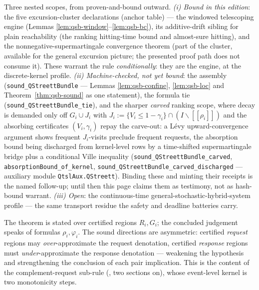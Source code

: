 \begin{bremark}\label{rem:qsb-scope}
Three nested scopes, from proven-and-bound outward. \emph{(i) Bound in
this edition}: the five excursion-cluster declarations (anchor table) ---
the windowed telescoping engine (Lemmas
\ref{lem:qsb-window}--\ref{lem:qsb-bc}), its additive-drift sibling for
plain reachability (the ranking hitting-time bound and almost-sure
hitting), and the nonnegative-supermartingale convergence theorem (part
of the cluster, available for the general excursion picture; the
presented proof path does not consume it). These warrant the rule
\emph{conditionally}: they are the engine, at the discrete-kernel
profile. \emph{(ii) Machine-checked, not yet bound}: the assembly
(\texttt{sound\_QStreettBundle} --- Lemmas \ref{lem:qsb-confine},
\ref{lem:qsb-loc} and Theorem~\ref{thm:qsb-sound} as one statement), the
formula tie (\texttt{sound\_QStreettBundle\_tie}), and the sharper
\emph{carved} ranking scope, where decay is demanded only off
$G_i \cup J_i$ with $J_i := \{V_i \le 1 - \gamma_i\} \cap
(I \smallsetminus [\![\rho_i]\!])$ and the absorbing certificates
$(V_i, \gamma_i)$ repay the carve-out: a L\'evy upward-convergence
argument shows frequent $J_i$-visits preclude frequent requests, the
absorption bound being discharged from kernel-level rows by a time-shifted
supermartingale bridge plus a conditional Ville inequality
(\texttt{sound\_QStreettBundle\_carved},
\texttt{absorptionBound\_of\_kernel},
\texttt{sound\_QStreettBundle\_carved\_discharged} --- auxiliary module
\texttt{QtslAux.QStreett}). Binding these and minting their
receipts is the named follow-up; until then this page claims them as
testimony, not as hash-bound warrant. \emph{(iii) Open}: the
continuous-time general-stochastic-hybrid-system profile --- the same
transport residue the safety and deadline batteries carry.
\end{bremark}

\begin{bremark}\label{rem:qsb-tie}
The theorem is stated over certified regions $R_i, G_i$; the concluded
judgement speaks of formulas $\rho_i, \varphi_i$. The sound directions are
asymmetric: certified \emph{request} regions may \emph{over}-approximate
the request denotation, certified \emph{response} regions must
\emph{under}-approximate the response denotation --- weakening the
hypothesis and strengthening the conclusion of each pair implication.
This is the content of the complement-request sub-rule
(, two sections on), whose event-level kernel
is two monotonicity steps.
\end{bremark}

